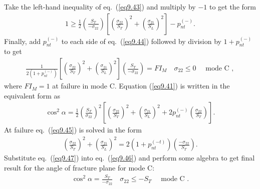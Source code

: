 \documentclass{AeroStructure-ERJohnson}
\begin{document}
Take the left-hand inequality of eq.~(\ref{eq9.43}) and multiply by $-1$ to get the form
\begin{align}\label{eq9.44}
1 \geq \frac{1}{2}\left(\frac{S_{T}}{-\sigma_{22}}\right)\left[\left(\frac{\sigma_{22}}{S_{T}}\right)^{2}+\left(\frac{\sigma_{21}}{S_{L}}\right)^{2}\right]-p_{n t}^{(-)}.
\end{align}
Finally, add $p_{nt}^{(-)}$ to each side of eq.~(\ref{eq9.44}) followed by division by $1+p_{n t}^{(-)}$ to get
\begin{align}\label{eq9.45}
\frac{1}{2\left(1+p_{n t}^{(-)}\right)}\left[\left(\frac{\sigma_{22}}{S_{T}}\right)^{2}+\left(\frac{\sigma_{21}}{S_{L}}\right)^{2}\right]\left(\frac{S_{T}}{-\sigma_{22}}\right)=F I_{M} \quad \sigma_{22} \leq 0 \quad \text { mode C },
\end{align}
where $\textit{FI}_M = 1$ at failure in mode C. Equation (\ref{eq9.41}) is written in the equivalent form as
\begin{align}\label{eq9.46}
\cos ^{2} \alpha=\frac{1}{2}\left(\frac{S_{T}}{\sigma_{22}}\right)^{2}\left[\left(\frac{\sigma_{22}}{S_{T}}\right)^{2}+\left(\frac{\sigma_{21}}{S_{L}}\right)^{2}+2 p_{n t}^{(-)}\left(\frac{\sigma_{22}}{S_{T}}\right)\right].
\end{align}
At failure eq.~(\ref{eq9.45}) is solved in the form
\begin{align}\label{eq9.47}
\left(\frac{\sigma_{22}}{S_{T}}\right)^{2}+\left(\frac{\sigma_{21}}{S_{L}}\right)^{2}=2\left(1+p_{n t}^{(-t)}\right)\left(\frac{-\sigma_{22}}{S_{T}}\right).
\end{align}
Substitute eq.~(\ref{eq9.47}) into eq.~(\ref{eq9.46}) and perform some algebra to get final result for the angle of fracture plane for mode C:
\begin{align}\label{eq9.48}
\cos ^{2} \alpha=\frac{S_{T}}{-\sigma_{22}} \quad \sigma_{22} \leq-S_{T} \quad \text { mode C }.
\end{align}
\end{document}
